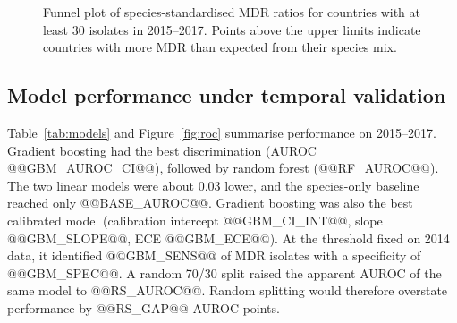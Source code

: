 \documentclass[11pt,a4paper]{article}
\begin{document}
\begin{figure}[t]
\centering
{}
\caption{Funnel plot of species-standardised MDR ratios for countries with at least 30 isolates in 2015--2017. Points above the upper limits indicate countries with more MDR than expected from their species mix.}
\label{fig:funnel}
\end{figure}

\subsection{Model performance under temporal validation}
Table~\ref{tab:models} and Figure~\ref{fig:roc} summarise performance on 2015--2017. Gradient boosting had the best discrimination (AUROC @@GBM_AUROC_CI@@), followed by random forest (@@RF_AUROC@@). The two linear models were about 0.03 lower, and the species-only baseline reached only @@BASE_AUROC@@. Gradient boosting was also the best calibrated model (calibration intercept @@GBM_CI_INT@@, slope @@GBM_SLOPE@@, ECE @@GBM_ECE@@). At the threshold fixed on 2014 data, it identified @@GBM_SENS@@ of MDR isolates with a specificity of @@GBM_SPEC@@. A random 70/30 split raised the apparent AUROC of the same model to @@RS_AUROC@@. Random splitting would therefore overstate performance by @@RS_GAP@@ AUROC points.
\end{document}
